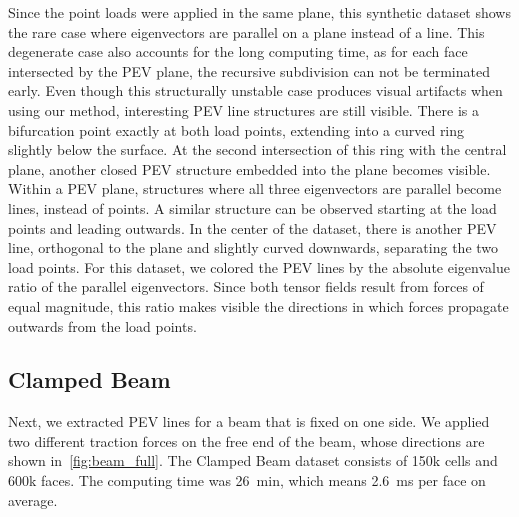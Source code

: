%
Since the point loads were applied in the same plane, this synthetic dataset
shows the rare case where eigenvectors are parallel on a plane instead of a
line.
%
This degenerate case also accounts for the long computing time, as for each face
intersected by the \ac{PEV} plane, the recursive subdivision can not be terminated
early.
%
Even though this structurally unstable case produces visual artifacts when
using our method, interesting \ac{PEV} line structures are still visible.
%
There is a bifurcation point exactly at both load points, extending into a
curved ring slightly below the surface.
%
At the second intersection of this ring with the central plane, another closed
\ac{PEV} structure embedded into the plane becomes visible.
%
Within a \ac{PEV} plane, structures where all three eigenvectors are parallel become
lines, instead of points.
%
A similar structure can be observed starting at the load points and leading
outwards.
%
In the center of the dataset, there is another \ac{PEV} line, orthogonal to the
plane and slightly curved downwards, separating the two load points.
%
For this dataset, we colored the \ac{PEV} lines by the absolute eigenvalue ratio of
the parallel eigenvectors.
%
Since both tensor fields result from forces of equal magnitude, this ratio makes
visible the directions in which forces propagate outwards from the load points.
%
%
\subsection*{Clamped Beam} %
\label{ssub:clamped_beam}
%
%
%
%
%
Next, we extracted \ac{PEV} lines for a beam that is fixed on one side.
%
We applied two different traction forces on the free end of the beam, whose
directions are shown in~\cref{fig:beam_full}.
%
The Clamped Beam dataset consists of 150k cells and 600k faces.
%
The computing time was \SI{26}{\minute}, which means \SI{2.6}{\milli\second}
per face on average.
%

%
%

